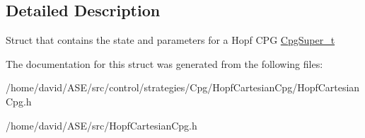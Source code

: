 \subsection{Detailed Description}
Struct that contains the state and parameters for a Hopf CPG  \hyperlink{structCpgSuper__t}{CpgSuper\_\-t} 

The documentation for this struct was generated from the following files:\begin{CompactItemize}
\item 
/home/david/ASE/src/control/strategies/Cpg/HopfCartesianCpg/HopfCartesianCpg.h\item 
/home/david/ASE/src/HopfCartesianCpg.h\end{CompactItemize}
